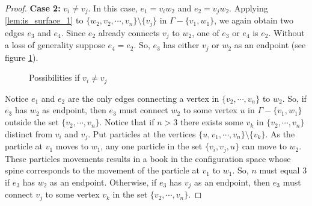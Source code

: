 \begin{proof}
    \textbf{Case 2:} \(v_i \neq v_j\).
    In this case, \(e_1 = v_i w_2\) and \(e_2 = v_j w_2\).
    Applying \ref{lem:is_surface_1} to \(\{w_2, v_2, \cdots, v_n\}\setminus\{v_j\}\) in \(\Gamma - \{v_1, w_1\}\),
    we again obtain two edges \(e_3\) and \(e_4\).
    Since \(e_2\) already connects \(v_j\) to \(w_2\), one of \(e_3\) or \(e_4\) is \(e_2\).
    Without a loss of generality suppose \(e_4 = e_2\).
    So, \(e_3\) has either \(v_j\) or \(w_2\) as an endpoint (see figure \ref{fig:lem:is_surface_2_2}).
    \begin{figure}
        \centering
        \quad\quad
        \caption{Possibilities if \(v_i \neq v_j\)}
        \label{fig:lem:is_surface_2_2}
    \end{figure}
    Notice \(e_1\) and \(e_2\) are the only edges connecting a vertex in \(\{v_2, \cdots, v_n\}\) to \(w_2\).
    So, if \(e_3\) has \(w_2\) as endpoint, then \(e_3\) must connect \(w_2\) to some vertex \(u\) in \(\Gamma - \{v_1, w_1\}\) outside the set \(\{v_2, \cdots, v_n\}\).
    Notice that if \(n > 3\) there exists some \(v_k\) in \(\{v_2, \cdots, v_n\}\) distinct from \(v_i\) and \(v_j\). Put 
    particles at the vertices \(\{u, v_1, \cdots, v_n\}\setminus\{v_k\}\). As the particle at \(v_1\) moves to \(w_1\),
    any one particle in the set \(\{v_i, v_j, u\}\) can move to \(w_2\). These particles movements results in a book
    in the configuration space whose spine corresponds to the movement of the particle at \(v_1\) to \(w_1\). So, \(n\) must equal \(3\)
    if \(e_3\) has \(w_2\) as an endpoint.
    Otherwise, if \(e_3\) has \(v_j\) as an endpoint, then \(e_3\) must connect \(v_j\) to some vertex \(v_k\) in the set \(\{v_2, \cdots, v_n\}\).


\end{proof}
